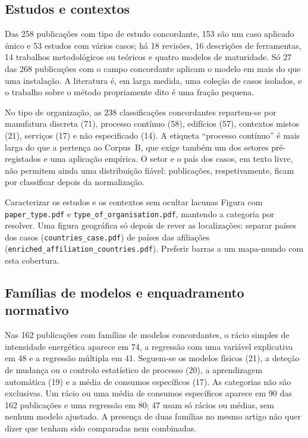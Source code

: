 \subsection{Estudos e contextos}

Das 258 publicações com tipo de estudo concordante, 153 são um caso aplicado
único e 53 estudos com vários casos; há 18 revisões, 16 descrições de
ferramentas, 14 trabalhos metodológicos ou teóricos e quatro modelos de
maturidade. Só 27 das 268 publicações com o campo concordante aplicam o
modelo em mais do que uma instalação. A literatura é, em larga medida, uma
coleção de casos isolados, e o trabalho sobre o método propriamente dito é
uma fração pequena.

No tipo de organização, as 238 classificações concordantes repartem-se por
manufatura discreta (71), processo contínuo (58), edifícios (57), contextos
mistos (21), serviços (17) e não especificado (14). A etiqueta ``processo
contínuo'' é mais larga do que a pertença ao Corpus~B, que exige também um
dos setores pré-registados e uma aplicação empírica. O setor e o país dos
casos, em texto livre, não permitem ainda uma distribuição fiável:  publicações, respetivamente, ficam por classificar depois da
normalização. 

{Caracterizar os estudos e os contextos sem ocultar lacunas}
{Figura com \texttt{paper\_type.pdf} e \texttt{type\_of\_organisation.pdf},
mantendo a categoria por resolver. Uma figura geográfica só depois de rever
as localizações: separar países dos casos (\texttt{countries\_case.pdf}) de
países das afiliações (\texttt{enriched\_affiliation\_countries.pdf}).
Preferir barras a um mapa-mundo com esta cobertura.}%

\subsection{Famílias de modelos e enquadramento normativo}

Nas 162 publicações com famílias de modelos concordantes, o rácio simples de
intensidade energética aparece em 74, a regressão com uma variável
explicativa em 48 e a regressão múltipla em 41. Seguem-se os modelos físicos
(21), a deteção de mudança ou o controlo estatístico de processo (20), a
aprendizagem automática (19) e a média de consumos específicos (17). As
categorias não são exclusivas. Um rácio ou uma média de consumos específicos
aparece em 90 das 162 publicações e uma regressão em 80; 47 usam só rácios
ou médias, sem nenhum modelo ajustado. A presença de duas famílias no mesmo
artigo não quer dizer que tenham sido comparadas nem combinadas.


